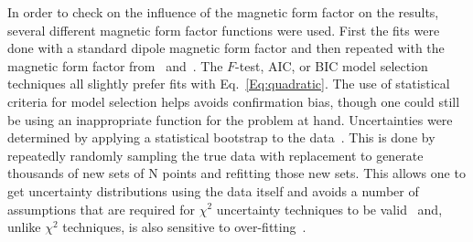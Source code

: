 \documentclass[10pt,superscriptaddress,aps,prc,twocolumn]{revtex4-1}
\begin{document}
In order to check on the influence of the magnetic form factor on the results, 
several different magnetic form factor functions were used.
First the fits were done with a standard dipole magnetic form factor
and then repeated with the magnetic form factor from~\cite{Bernauer:2013tpr} and~\cite{Ye:2017gyb}.    
The $F$-test, AIC, or BIC model selection techniques all slightly prefer fits with Eq.~\ref{Eq:quadratic}.
The use of statistical criteria for model selection helps avoids confirmation bias,
though one could still be using an inappropriate function for the problem at hand. 
Uncertainties were determined by applying a statistical bootstrap to the data~\cite{Efron:1979}.   This is done
by repeatedly randomly sampling the true data with replacement to generate thousands of new sets of N points 
and refitting those new sets.   This allows one to get uncertainty distributions using the data itself and
avoids a number of assumptions that are required for $\chi^2$ uncertainty techniques 
to be valid~\cite{Efron:1979} and, unlike $\chi^2$ techniques, is also sensitive to over-fitting~\cite{Andrae:2010}.
\end{document}
